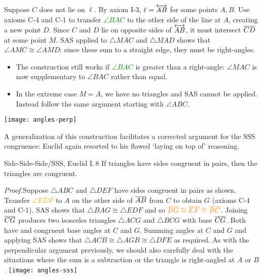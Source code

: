 \begin{minipage}[t]{0.7\linewidth}\vspace{0pt}

Suppose $C$ does not lie on $\ell$. By axiom I-3, $\ell=\overleftrightarrow{AB}$ for some points $A,B$.\smallbreak
Use axioms C-4 and C-1 to transfer \textcolor{Green}{$\angle BAC$} to the other side of the line at $A$, creating a new point $D$.\smallbreak
Since $C$ and $D$ lie on opposite sides of $\overleftrightarrow{AB}$, it must intersect $\overline{CD}$ at some point $M$.\smallbreak
SAS applied to $\triangle MAC$ and $\triangle MAD$ shows that $\angle AMC\cong\angle AMD$: since these sum to a straight edge, they must be right-angles.
\begin{itemize}\itemsep0pt
  \item The construction still works if \textcolor{Green}{$\angle BAC$} is greater than a right-angle: $\angle MAC$ is now supplementary to $\angle BAC$ rather than equal.
  \item In the extreme case $M=A$, we have no triangles and SAS cannot be applied. Instead follow the same argument starting with $\angle ABC$.
\end{itemize}
\end{minipage}\begin{minipage}[t]{0.3\linewidth}\vspace{0pt}
\flushright\texttt{[image: angles-perp]}
\end{minipage}\bigbreak

A generalization of this construction facilitates a corrected argument for the SSS congruence: Euclid again resorted to his flawed `laying on top of' reasoning.

\begin{thm}{Side-Side-Side/SSS, Euclid I.\,8}{}
If triangles have sides congruent in pairs, then the triangles are congruent.
\end{thm}


\begin{tcolorbox}[proofstyle, lower separated=false, sidebyside, sidebyside align=top seam, sidebyside gap=0pt, righthand width=0.4\linewidth]
\emph{Proof.}\lstsp Suppose $\triangle ABC$ and $\triangle DEF$ have sides congruent in pairs as shown.\smallbreak
Transfer \textcolor{orange}{$\angle EDF$} to $A$ on the other side of $\overline{AB}$ from $C$ to obtain $G$ (axioms C-4 and C-1).\smallbreak
SAS shows that $\triangle BAG\cong\triangle EDF$ and so $\textcolor{orange}{\overline{BG}\cong\overline{EF}\cong\overline{BC}}$.\smallbreak
Joining $\overline{CG}$ produces two isosceles triangles $\triangle ACG$ and $\triangle BCG$ with base $\overline{CG}$. Both have and congruent base angles at $C$ and $G$.\smallbreak
Summing angles at $C$ and $G$ and applying SAS shows that $\triangle ACB\cong\triangle AGB\cong\triangle DFE$ as required.\medbreak
As with the perpendicular argument previously, we should also carefully deal with the situations where the sum is a subtraction or the triangle is right-angled at $A$ or $B$.
\tcblower
\flushright\texttt{[image: angles-sss]}\\[-10pt]\hfill\qedsymbol
\end{tcolorbox}


